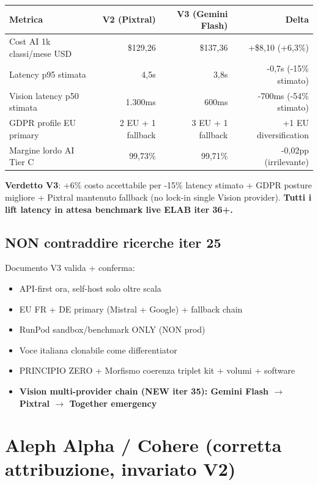 \documentclass[12pt,a4paper]{article}
\begin{document}
\begin{center}
\begin{tabular}{lrrr}
\toprule
\textbf{Metrica} & \textbf{V2 (Pixtral)} & \textbf{V3 (Gemini Flash)} & \textbf{Delta} \\
\midrule
Cost AI 1k classi/mese USD & \$129,26 & \$137,36 & +\$8,10 (+6,3\%) \\
Latency p95 stimata        & ~4,5s    & ~3,8s    & -0,7s (-15\% stimato) \\
Vision latency p50 stimata & ~1.300ms & ~600ms   & -700ms (-54\% stimato) \\
GDPR profile EU primary    & 2 EU + 1 fallback & 3 EU + 1 fallback & +1 EU diversification \\
Margine lordo AI Tier C    & 99,73\%  & 99,71\%  & -0,02pp (irrilevante) \\
\bottomrule
\end{tabular}
\end{center}

\textbf{Verdetto V3}: +6\% costo accettabile per -15\% latency stimato + GDPR posture migliore + Pixtral mantenuto fallback (no lock-in single Vision provider). \textbf{Tutti i lift latency in attesa benchmark live ELAB iter 36+.}

\subsection*{NON contraddire ricerche iter 25}

Documento V3 valida + conferma:
\begin{itemize}[leftmargin=*]
  \item API-first ora, self-host solo oltre scala
  \item EU FR + DE primary (Mistral + Google) + fallback chain
  \item RunPod sandbox/benchmark ONLY (NON prod)
  \item Voce italiana clonabile come differentiator
  \item PRINCIPIO ZERO + Morfismo coerenza triplet kit + volumi + software
  \item \textbf{Vision multi-provider chain (NEW iter 35): Gemini Flash \(\rightarrow\) Pixtral \(\rightarrow\) Together emergency}
\end{itemize}

\section{Aleph Alpha / Cohere (corretta attribuzione, invariato V2)}
\end{document}
